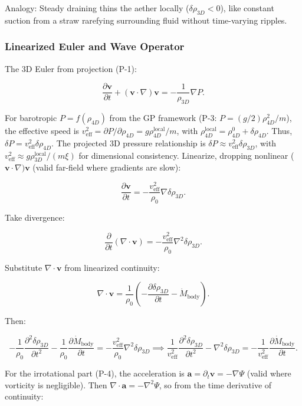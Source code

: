 \documentclass{article}
\begin{document}
Analogy: Steady draining thins the aether locally ($\delta \rho_{3D} < 0$), like constant suction from a straw rarefying surrounding fluid without time-varying ripples.

\subsubsection{Linearized Euler and Wave Operator}

The 3D Euler from projection (P-1):

\[
\frac{\partial \mathbf{v}}{\partial t} + (\mathbf{v} \cdot \nabla) \mathbf{v} = -\frac{1}{\rho_{3D}} \nabla P.
\]

For barotropic $P = f(\rho_{4D})$ from the GP framework (P-3: $P = (g/2) \rho_{4D}^2 / m$), the effective speed is $v_{\text{eff}}^2 = \partial P / \partial \rho_{4D} = g \rho_{4D}^{\text{local}} / m$, with $\rho_{4D}^{\text{local}} = \rho_{4D}^0 + \delta \rho_{4D}$. Thus, $\delta P = v_{\text{eff}}^2 \delta \rho_{4D}$. The projected 3D pressure relationship is $\delta P \approx v_{\text{eff}}^2 \delta \rho_{3D}$, with $v_{\text{eff}}^2 \approx g \rho_{3D}^{\text{local}} / (m \xi)$ for dimensional consistency. Linearize, dropping nonlinear ($\mathbf{v} \cdot \nabla) \mathbf{v}$ (valid far-field where gradients are slow):

\[
\frac{\partial \mathbf{v}}{\partial t} = -\frac{v_{\text{eff}}^2}{\rho_0} \nabla \delta \rho_{3D}.
\]

Take divergence:

\[
\frac{\partial}{\partial t} (\nabla \cdot \mathbf{v}) = -\frac{v_{\text{eff}}^2}{\rho_0} \nabla^2 \delta \rho_{3D}.
\]

Substitute $\nabla \cdot \mathbf{v}$ from linearized continuity:

\[
\nabla \cdot \mathbf{v} = \frac{1}{\rho_0} \left( -\frac{\partial \delta \rho_{3D}}{\partial t} - \dot{M}_{\text{body}} \right).
\]

Then:

\[
-\frac{1}{\rho_0} \frac{\partial^2 \delta \rho_{3D}}{\partial t^2} - \frac{1}{\rho_0} \frac{\partial \dot{M}_{\text{body}}}{\partial t} = -\frac{v_{\text{eff}}^2}{\rho_0} \nabla^2 \delta \rho_{3D} \implies \frac{1}{v_{\text{eff}}^2} \frac{\partial^2 \delta \rho_{3D}}{\partial t^2} - \nabla^2 \delta \rho_{3D} = -\frac{1}{v_{\text{eff}}^2} \frac{\partial \dot{M}_{\text{body}}}{\partial t}.
\]

For the irrotational part (P-4), the acceleration is $\mathbf{a} = \partial_t \mathbf{v} = -\nabla \Psi$ (valid where vorticity is negligible). Then $\nabla \cdot \mathbf{a} = -\nabla^2 \Psi$, so from the time derivative of continuity:
\end{document}
